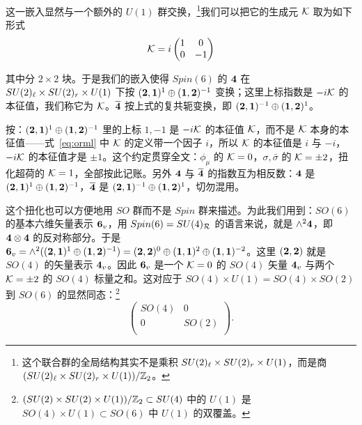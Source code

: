 这一嵌入显然与一个额外的 $U(1)$ 群交换，\footnote{这个联合群的全局结构其实不是乘积 $SU(2)_\ell\times SU(2)_\rr\times U(1)$，而是商 $(SU(2)_\ell\times SU(2)_\rr\times U(1))/\Bbb{Z}_2$。}我们可以把它的生成元 ${\cal K}$ 取为如下形式 %
\setcounter{equation}{2}
\begin{equation}\label{eq:orml}
{\cal K}=i\left(\begin{matrix}1&  0 \\
                                                  0    &
                                                  -1\\\end{matrix}\right)
\end{equation}

其中分 $2\times 2$ 块。于是我们的嵌入使得 $Spin(6)$ 的 ${\bf 4}$ 在 $SU(2)_\ell\times SU(2)_\rr\times U(1)$ 下按 $({\bf 2},\bone)^{1}\oplus(\bone,{\bf 2})^{-1}$ 变换；这里上标指数是 $-i{\cal K}$ 的本征值，我们称它为 ${\EUK}$。$\bar{\bf 4}$ 按上式的复共轭变换，即 $({\bf 2},\bone)^{-1}\oplus(\bone,{\bf 2})^{1}$。

\begin{yizhu}[易错点]
按：$({\bf 2},\bone)^{1}\oplus(\bone,{\bf 2})^{-1}$ 里的上标 $1,-1$ 是 $-i{\cal K}$ 的本征值 ${\EUK}$，而不是 ${\cal K}$ 本身的本征值——式~\eqref{eq:orml} 中 ${\cal K}$ 的定义带一个因子 $i$，所以 ${\cal K}$ 的本征值是 $i$ 与 $-i$，$-i{\cal K}$ 的本征值才是 $\pm 1$。这个约定贯穿全文：$\phi_\mu$ 的 ${\EUK}=0$，$\sigma,\bar\sigma$ 的 ${\EUK}=\pm 2$，扭化超荷的 ${\EUK}=1$，全部按此记账。另外 ${\bf 4}$ 与 $\bar{\bf 4}$ 的指数互为相反数：${\bf 4}$ 是 $({\bf 2},\bone)^{1}\oplus(\bone,{\bf 2})^{-1}$，$\bar{\bf 4}$ 是 $({\bf 2},\bone)^{-1}\oplus(\bone,{\bf 2})^{1}$，切勿混用。
\end{yizhu}

这个扭化也可以方便地用 $SO$ 群而不是 $Spin$ 群来描述。为此我们用到：$SO(6)$ 的基本六维矢量表示 ${\bf 6_v}$，用 $Spin(6)=SU(4)_{{\cal R}}$ 的语言来说，就是 $\wedge^2 {\bf 4}$，即 ${\bf 4}\otimes{\bf 4}$ 的反对称部分。于是 ${\bf 6_v}=\wedge^2(({\bf 2},\bone)^{1}\oplus(\bone,{\bf 2})^{-1})=(\btwo,\btwo)^0\oplus(\bone,\bone)^2\oplus(\bone,\bone)^{-2}$。这里 $(\btwo,\btwo)$ 就是 $SO(4)$ 的矢量表示 ${\bf 4_v}$。因此 ${\bf 6_v}$ 是一个 ${\EUK}=0$ 的 $SO(4)$ 矢量 ${\bf 4_v}$ 与两个 ${\EUK}=\pm 2$ 的 $SO(4)$ 标量之和。这对应于 $SO(4)\times U(1)=SO(4)\times SO(2)$ 到 $SO(6)$ 的显然同态：\footnote{$(SU(2)\times SU(2)\times U(1))/\Bbb{Z}_2\subset SU(4)$ 中的 $U(1)$ 是 $SO(4)\times U(1)\subset SO(6)$ 中 $U(1)$ 的双覆盖。} %
\setcounter{equation}{3}
\begin{equation}\label{eq:tomo}
\left(\begin{matrix}SO(4) &
0 \\ 0 & SO(2)\\\end{matrix}\right).
\end{equation}

